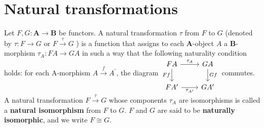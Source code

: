 \documentclass{book}
\begin{document}
\section{Natural transformations}
Let $F, G: \mathbf{A} \rightarrow \mathbf{B}$ be functors. A natural transformation $\tau$ from $F$ to $G$ (denoted by $\tau: F \rightarrow G$ or $F \xrightarrow{\tau} G$ ) is a function that assigns to each $\mathbf{A}$-object $A$ a $\mathbf{B}$-morphism $\tau_A: F A \rightarrow G A$ in such a way that the following naturality condition holds: for each A-morphism $A \xrightarrow{f} A^{\prime}$, the diagram
$
\begin{tikzcd}
FA \arrow[r, "\tau_A"] \arrow[d, "Ff"'] & GA \arrow[d, "Gf"] \\
FA' \arrow[r, "\tau_{A'}"'] & GA'
\end{tikzcd}
$ commutes.\\
A natural transformation $F \xrightarrow{\tau} G$ whose components $\tau_A$ are isomorphisms is called a \textbf{natural isomorphism} from $F$ to $G$. $F$ and $G$ are said to be \textbf{naturally isomorphic}, and we write $F \cong G$.
\end{document}
